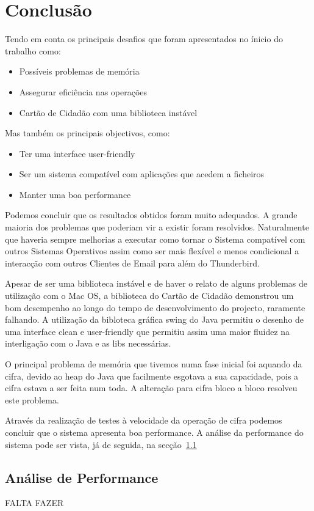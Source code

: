 \newpage
\chapter{Conclusão}
\label{chapter:conclusions}

Tendo em conta os principais desafios que foram apresentados no ínicio do trabalho como:
\begin{itemize}
\item Possíveis problemas de memória
\item Assegurar eficiência nas operações
\item Cartão de Cidadão com uma biblioteca instável
\end{itemize}
Mas também os principais objectivos, como:
\begin{itemize}
\item Ter uma interface user-friendly
\item Ser um sistema compatível com aplicações que acedem a ficheiros
\item Manter uma boa performance
\end{itemize}

Podemos concluir que os resultados obtidos foram muito adequados.
A grande maioria dos problemas que poderiam vir a existir foram resolvidos. Naturalmente que haveria sempre melhorias a executar como tornar o Sistema compatível com outros Sistemas Operativos assim como ser mais flexível e menos condicional a interacção com outros Clientes de Email para além do Thunderbird.

Apesar de ser uma biblioteca instável e de haver o relato de alguns problemas de utilização com o Mac OS, a biblioteca do Cartão de Cidadão demonstrou um bom desempenho ao longo do tempo de desenvolvimento do projecto, raramente falhando.
A utilização da bibloteca gráfica swing do Java permitiu o desenho de uma interface clean e user-friendly que permitiu assim uma maior fluidez na interligação com o Java e as libs necessárias.

O principal problema de memória que tivemos numa fase inicial foi aquando da cifra, devido ao heap do Java que facilmente esgotava a sua capacidade, pois a cifra estava a ser feita num toda. A alteração para cifra bloco a bloco resolveu este problema.

Através da realização de testes à velocidade da operação de cifra podemos concluir que o sistema apresenta boa performance. A análise da performance do sistema pode ser vista, já de seguida, na secção~\ref{section:performance}

\section{Análise de Performance}
\label{section:performance}

FALTA FAZER